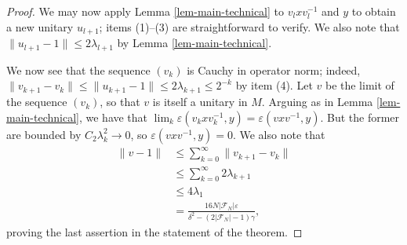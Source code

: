 \documentclass[10pt,a4paper]{amsart}
\newcommand{\cF}{\mathcal{F}}
\newcommand{\ee}{\varepsilon}
\begin{document}
\begin{proof}
    We may now apply Lemma \ref{lem-main-technical} to $v_lxv_l^{-1}$ and $y$ to obtain a new unitary $u_{l+1}$; items (1)--(3) are straightforward to verify. We also note that $\|u_{l+1} - 1\| \le 2\lambda_{l+1}$ by Lemma \ref{lem-main-technical}.

    We now see that the sequence $(v_k)$ is Cauchy in operator norm; indeed, $\|v_{k+1} - v_k\| \le \|u_{k+1}-1\| \le 2\lambda_{k+1} \le 2^{-k}$ by item (4). Let $v$ be the limit of the sequence $(v_k)$, so that $v$ is itself a unitary in $M$. Arguing as in Lemma \ref{lem-main-technical}, we have that $\lim_k \ee(v_kxv_k^{-1},y)= \ee(vxv^{-1},y)$. But the former are bounded by $C_2\lambda_k^2 \to 0$, so $\ee(vxv^{-1},y) = 0.$ We also note that 
    \begin{align*}
        \|v-1\| &\le \sum_{k=0}^\infty \|v_{k+1}-v_k\| \\
        &\le \sum_{k=0}^\infty 2\lambda_{k+1}\\
        &\le 4\lambda_1 \\
        &= \frac{16N|\cF_N|\ee}{\delta^2 - (2|\cF_N|-1)\gamma}, 
    \end{align*}
    proving the last assertion in the statement of the theorem.
\end{proof}
\end{document}
